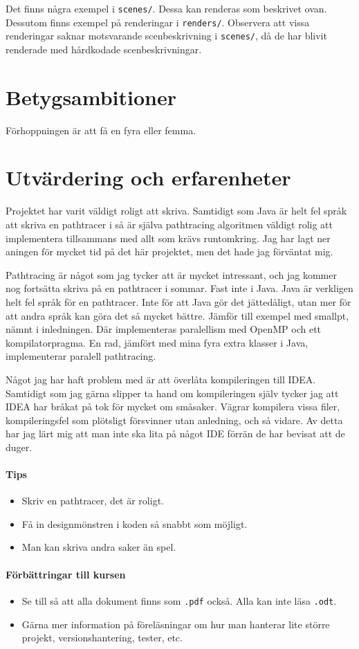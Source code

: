 \documentclass{article}
\begin{document}
Det finns några exempel i \texttt{scenes/}. Dessa kan renderas som
beskrivet ovan. Dessutom finns exempel på renderingar i
\texttt{renders/}. Observera att vissa renderingar saknar motsvarande
scenbeskrivning i \texttt{scenes/}, då de har blivit renderade med
hårdkodade scenbeskrivningar.



\section{Betygsambitioner}
Förhoppningen är att få en fyra eller femma.

\section{Utvärdering och erfarenheter}
Projektet har varit väldigt roligt att skriva. Samtidigt som Java är
helt fel språk att skriva en pathtracer i så är själva pathtracing
algoritmen väldigt rolig att implementera tillsammans med allt som
krävs runtomkring. Jag har lagt ner aningen för mycket tid på det här
projektet, men det hade jag förväntat mig.

Pathtracing är något som jag tycker att är mycket intressant, och jag
kommer nog fortsätta skriva på en pathtracer i sommar. Fast inte i
Java. Java är verkligen helt fel språk för en pathtracer. Inte för att
Java gör det jättedåligt, utan mer för att andra språk kan göra det så
mycket bättre. Jämför till exempel med smallpt, nämnt i
inledningen. Där implementeras paralellism med OpenMP och ett
kompilatorpragma. En rad, jämfört med mina fyra extra klasser i Java,
implementerar paralell pathtracing.

Något jag har haft problem med är att överlåta kompileringen till
IDEA. Samtidigt som jag gärna slipper ta hand om kompileringen själv
tycker jag att IDEA har bråkat på tok för mycket om småsaker. Vägrar
kompilera vissa filer, kompileringsfel som plötsligt försvinner utan
anledning, och så vidare. Av detta har jag lärt mig att man inte ska
lita på något IDE förrän de har bevisat att de duger.

\paragraph{Tips}
\begin{itemize}
\item Skriv en pathtracer, det är roligt.
\item Få in designmönstren i koden så snabbt som möjligt.
\item Man kan skriva andra saker än spel.
\end{itemize}

\paragraph{Förbättringar till kursen}
\begin{itemize}
\item Se till så att alla dokument finns som
  \texttt{.pdf} också. Alla kan inte läsa \texttt{.odt}.
\item Gärna mer information på föreläsningar om hur man hanterar lite
  större projekt, versionshantering, tester, etc.
\end{itemize}
\end{document}
